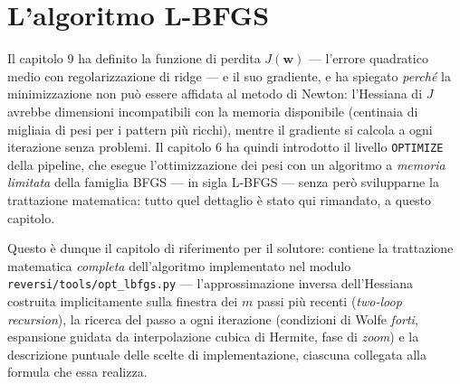 %
%
%
%
%
%
%
%
%
%

\chapter{L'algoritmo L-BFGS}

\label{ch:lbfgs}

Il capitolo 9 ha definito la funzione di perdita $J(\bm{w})$ — l'errore
quadratico medio con regolarizzazione di ridge — e il suo gradiente, e ha
spiegato \emph{perché} la minimizzazione non può essere affidata al metodo di
Newton: l'Hessiana di $J$ avrebbe dimensioni incompatibili con la memoria
disponibile (centinaia di migliaia di pesi per i pattern più ricchi), mentre
il gradiente si calcola a ogni iterazione senza problemi. Il capitolo 6 ha
quindi introdotto il livello \texttt{OPTIMIZE} della pipeline, che esegue
l'ottimizzazione dei pesi con un algoritmo a \emph{memoria limitata} della
famiglia BFGS — in sigla L-BFGS — senza però svilupparne la trattazione
matematica: tutto quel dettaglio è stato qui rimandato, a questo capitolo.

Questo è dunque il capitolo di riferimento per il solutore: contiene la
trattazione matematica \emph{completa} dell'algoritmo implementato nel modulo
\texttt{reversi/tools/opt\_lbfgs.py} — l'approssimazione inversa dell'Hessiana
costruita implicitamente sulla finestra dei $m$ passi più recenti
(\/\emph{two-loop recursion}), la ricerca del passo a ogni iterazione
(condizioni di Wolfe \emph{forti}, espansione guidata da interpolazione cubica
di Hermite, fase di \emph{zoom}) e la descrizione puntuale delle scelte di
implementazione, ciascuna collegata alla formula che essa realizza.

